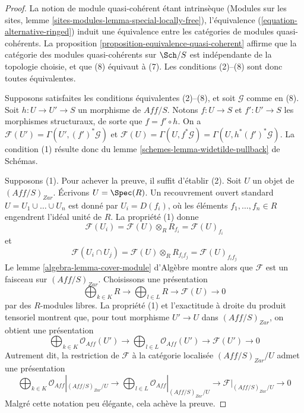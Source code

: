 \begin{proof}
La notion de module quasi-cohérent étant intrinsèque (Modules sur les sites,
lemme \ref{sites-modules-lemma-special-locally-free}), l'équivalence
(\ref{equation-alternative-ringed}) induit une équivalence entre les
catégories de modules quasi-cohérents. La
proposition \ref{proposition-equivalence-quasi-coherent} affirme que la
catégorie des modules quasi-cohérents sur $\Sch/S$ est indépendante de la
topologie choisie, et que (8) équivaut à (7). Les conditions
(2)--(8) sont donc toutes équivalentes.

\medskip\noindent
Supposons satisfaites les conditions équivalentes (2)--(8), et soit
$\mathcal{G}$ comme en (8). Soit $h : U \to U' \to S$ un morphisme de
$\textit{Aff}/S$. Notons $f : U \to S$ et $f' : U' \to S$ les morphismes
structuraux, de sorte que $f = f' \circ h$. On a
$\mathcal{F}(U') = \Gamma(U', (f')^*\mathcal{G})$ et
$\mathcal{F}(U) = \Gamma(U, f^*\mathcal{G}) = \Gamma(U, h^*(f')^*\mathcal{G})$.
La condition (1) résulte donc du lemme
\ref{schemes-lemma-widetilde-pullback} de Schémas.

\medskip\noindent
Supposons (1). Pour achever la preuve, il suffit d'établir (2).
Soit $U$ un objet de $(\textit{Aff}/S)_{Zar}$. Écrivons
$U = \Spec(R)$. Un recouvrement ouvert standard
$U = U_1 \cup \ldots \cup U_n$ est donné par $U_i = D(f_i)$, où les
éléments $f_1, \ldots, f_n \in R$ engendrent l'idéal unité de $R$.
La propriété (1) donne
$$
\mathcal{F}(U_i) =
\mathcal{F}(U) \otimes_R R_{f_i} =
\mathcal{F}(U)_{f_i}
$$
et
$$
\mathcal{F}(U_i \cap U_j) =
\mathcal{F}(U) \otimes_R R_{f_if_j} =
\mathcal{F}(U)_{f_if_j}
$$
Le lemme \ref{algebra-lemma-cover-module} d'Algèbre montre alors que
$\mathcal{F}$ est un faisceau sur $(\textit{Aff}/S)_{Zar}$. Choisissons une
présentation
$$
\bigoplus\nolimits_{k \in K} R
\longrightarrow
\bigoplus\nolimits_{l \in L} R
\longrightarrow
\mathcal{F}(U)
\longrightarrow 0
$$
par des $R$-modules libres. La propriété (1) et l'exactitude à droite du
produit tensoriel montrent que, pour tout morphisme $U' \to U$ dans
$(\textit{Aff}/S)_{Zar}$, on obtient une présentation
$$
\bigoplus\nolimits_{k \in K} \mathcal{O}_{Aff}(U')
\longrightarrow
\bigoplus\nolimits_{l \in L} \mathcal{O}_{Aff}(U')
\longrightarrow
\mathcal{F}(U')
\longrightarrow 0
$$
Autrement dit, la restriction de $\mathcal{F}$ à la catégorie localisée
$(\textit{Aff}/S)_{Zar}/U$ admet une présentation
$$
\bigoplus\nolimits_{k \in K} \mathcal{O}_{Aff}|_{(\textit{Aff}/S)_{Zar}/U}
\longrightarrow
\bigoplus\nolimits_{l \in L} \mathcal{O}_{Aff}|_{(\textit{Aff}/S)_{Zar}/U}
\longrightarrow
\mathcal{F}|_{(\textit{Aff}/S)_{Zar}/U}
\longrightarrow 0
$$
Malgré cette notation peu élégante, cela achève la preuve.
\end{proof}

